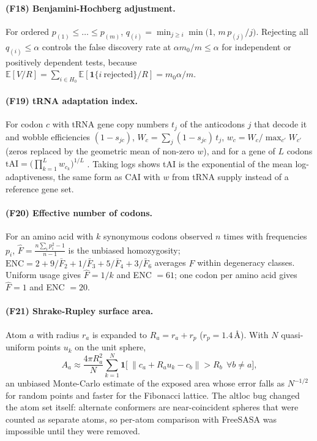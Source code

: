 \paragraph{(F18) Benjamini-Hochberg adjustment.} For ordered $p_{(1)}\le\dots\le p_{(m)}$,
$q_{(i)}=\min_{j\ge i}\min\big(1,\,m\,p_{(j)}/j\big)$. Rejecting all $q_{(i)}\le\alpha$ controls the
false discovery rate at $\alpha m_0/m\le\alpha$ for independent or positively dependent tests,
because $\mathbb{E}[V/R]=\sum_{i\in H_0}\mathbb{E}[\mathbf 1\{i\ \text{rejected}\}/R]=m_0\alpha/m$.

\paragraph{(F19) tRNA adaptation index.} For codon $c$ with tRNA gene copy numbers
$t_j$ of the anticodons $j$ that decode it and wobble efficiencies $(1-s_{jc})$,
$W_c=\sum_j(1-s_{jc})\,t_j$, $w_c=W_c/\max_{c'}W_{c'}$ (zeros replaced by the geometric mean
of non-zero $w$), and for a gene of $L$ codons
$\mathrm{tAI}=\big(\prod_{k=1}^{L}w_{c_k}\big)^{1/L}$ \cite{dosreis2004}.
Taking logs shows tAI is the exponential of the mean log-adaptiveness, the same form as CAI
\cite{sharpli1987} with $w$ from tRNA supply instead of a reference gene set.

\paragraph{(F20) Effective number of codons.} For an amino acid with $k$ synonymous codons
observed $n$ times with frequencies $p_i$, $\hat F=\frac{n\sum_ip_i^2-1}{n-1}$ is the unbiased
homozygosity; $\mathrm{ENC}=2+9/\bar F_2+1/\bar F_3+5/\bar F_4+3/\bar F_6$ averages $\hat F$
within degeneracy classes. Uniform usage gives $\hat F=1/k$ and ENC $=61$; one codon per
amino acid gives $\hat F=1$ and ENC $=20$.

\paragraph{(F21) Shrake-Rupley surface area.} Atom $a$ with radius $r_a$ is expanded to
$R_a=r_a+r_p$ ($r_p=1.4$\,\AA). With $N$ quasi-uniform points $u_k$ on the unit sphere,
\begin{equation}
A_a\approx\frac{4\pi R_a^2}{N}\sum_{k=1}^{N}\mathbf 1\Big[\ \|c_a+R_au_k-c_b\|>R_b\ \ \forall b\ne a\Big],
\end{equation}
an unbiased Monte-Carlo estimate of the exposed area whose error falls as $N^{-1/2}$ for random
points and faster for the Fibonacci lattice. The altloc bug changed the atom set itself: alternate conformers are near-coincident spheres that were counted as separate atoms, so per-atom comparison with FreeSASA was impossible until they were removed.

